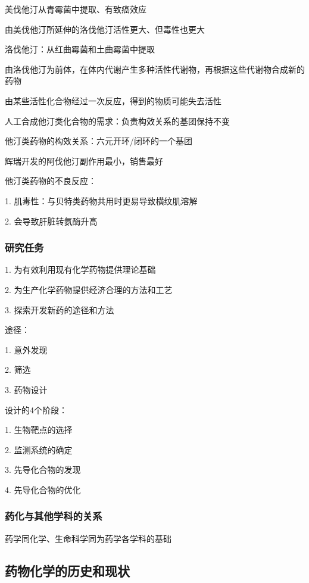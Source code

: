 \begin{notation}
    美伐他汀从青霉菌中提取、有致癌效应

    由美伐他汀所延伸的洛伐他汀活性更大、但毒性也更大

    洛伐他汀：从红曲霉菌和土曲霉菌中提取
\end{notation}
由洛伐他汀为前体，在体内代谢产生多种活性代谢物，再根据这些代谢物合成新的药物
\begin{notation}
    由某些活性化合物经过一次反应，得到的物质可能失去活性
\end{notation}
人工合成他汀类化合物的需求：负责构效关系的基团保持不变

他汀类药物的构效关系：六元开环/闭环的一个基团
\begin{notation}
    辉瑞开发的阿伐他汀副作用最小，销售最好
\end{notation}
他汀类药物的不良反应：

1. 肌毒性：与贝特类药物共用时更易导致横纹肌溶解

2. 会导致肝脏转氨酶升高
\subsubsection{研究任务}%
\label{subsub:研究任务-}
1. 为有效利用现有化学药物提供理论基础

2. 为生产化学药物提供经济合理的方法和工艺

3. 探索开发新药的途径和方法
\begin{notation}
    途径：

    1. 意外发现

    2. 筛选

    3. 药物设计

    设计的4个阶段：

    1. 生物靶点的选择

    2. 监测系统的确定

    3. 先导化合物的发现

    4. 先导化合物的优化
\end{notation}
\subsubsection{药化与其他学科的关系}%
\label{subsub:化与其他学科的关系-}
药学同化学、生命科学同为药学各学科的基础

\subsection{药物化学的历史和现状}%
\label{sub:药物化学的历史和现状}
